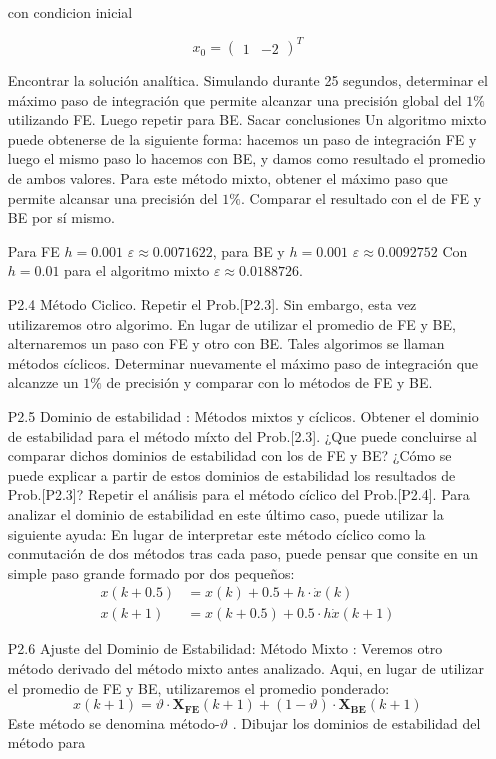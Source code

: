 \documentclass{article}
\begin{document}
\begin{itemize}
con condicion inicial

\begin{equation}
x_0 = \begin{pmatrix} 1 & -2\end{pmatrix}^T
 \label{P2.3b} \tag{P2.3b}
\end{equation}

Encontrar la solución analítica. Simulando durante 25 segundos, determinar el máximo paso de integración que permite alcanzar una precisión global del $1\%$ utilizando FE. Luego repetir para BE. Sacar conclusiones
Un algoritmo mixto puede obtenerse de la siguiente forma: hacemos un paso de integración FE y luego el mismo paso lo hacemos con BE, y damos como resultado el promedio de ambos valores. Para este método mixto, obtener el máximo paso que permite alcansar una precisión del $1\%$. Comparar el resultado con el de FE y BE por sí mismo.

Para FE $h = 0.001$ $\varepsilon \approx 0.0071622$, para BE y $h = 0.001$ $\varepsilon \approx 0.0092752 $ 
Con $h = 0.01$ para el algoritmo mixto $\varepsilon \approx 0.0188726$.
\item[P2.4] Método Ciclico. Repetir el Prob.[P2.3]. Sin embargo, esta vez utilizaremos otro algorimo. En lugar de utilizar el promedio de FE y BE, alternaremos un paso con FE y otro con BE. Tales algorimos se llaman métodos cíclicos.
Determinar nuevamente el máximo paso de integración que alcanzze un $1\%$ de precisión y comparar con lo métodos de FE y BE.
\item[P2.5] Dominio de estabilidad : Métodos mixtos y cíclicos. Obtener el dominio de estabilidad para el método míxto del Prob.[2.3]. ¿Que puede concluirse al comparar dichos dominios de estabilidad con los de FE y BE? ¿Cómo se puede explicar a partir de estos dominios de estabilidad los resultados de Prob.[P2.3]?
Repetir el análisis para el método cíclico del Prob.[P2.4]. Para analizar el dominio de estabilidad en este último caso, puede utilizar la siguiente ayuda:
En lugar de interpretar este método cíclico como la conmutación de dos métodos tras cada paso, puede pensar que consite en un simple paso grande formado por dos pequeños:
\begin{align}
	x(k+0.5) &= x(k) + 0.5 + h \cdot \dot{x}(k) \tag{P2.5a} \\
	x(k+1)   &= x(k + 0.5) + 0.5 \cdot h \dot{x}(k+1) \tag{P2.5b}
\end{align}
\item[P2.6] Ajuste del Dominio de Estabilidad: Método Mixto : Veremos otro método derivado del método mixto antes analizado. Aqui, en lugar de utilizar el promedio de FE y BE, utilizaremos el promedio ponderado:
\begin{equation}
x(k+1) = \vartheta \cdot \boldsymbol{X_{FE}}(k + 1) + (1 - \vartheta) \cdot \boldsymbol{X_{BE}}(k + 1)
\tag{P2.6a}
\end{equation}
Este método se denomina método-$\vartheta$ . Dibujar los dominios de estabilidad del método para


\end{itemize}
\end{document}
